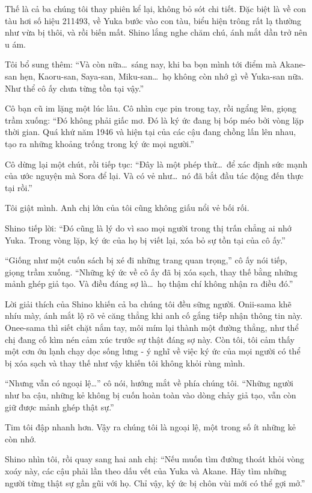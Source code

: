 \documentclass[../main.tex]{subfiles}
\begin{document}
Thế là cả ba chúng tôi thay phiên kể lại, không bỏ sót chi tiết. Đặc biệt là về con tàu hơi số hiệu 211493, về Yuka bước vào con tàu, biểu hiện trông rất lạ thường như vừa bị thôi, và rồi biến mất. Shino lắng nghe chăm chú, ánh mắt dần trở nên u ám.

Tôi bổ sung thêm: ``Và còn nữa\dots\ sáng nay, khi ba bọn mình tới điểm mà Akane-san hẹn, Kaoru-san, Saya-san, Miku-san\dots\ họ không còn nhớ gì về Yuka-san nữa. Như thể cô ấy chưa từng tồn tại vậy.''

Cô bạn cũ im lặng một lúc lâu. Cô nhìn cục pin trong tay, rồi ngẩng lên, giọng trầm xuống: ``Đó không phải giấc mơ. Đó là ký ức đang bị bóp méo bởi vòng lặp thời gian. Quá khứ năm 1946 và hiện tại của các cậu đang chồng lấn lên nhau, tạo ra những khoảng trống trong ký ức mọi người.''

Cô dừng lại một chút, rồi tiếp tục: ``Đây là một phép thử\dots\ để xác định sức mạnh của ước nguyện mà Sora để lại. Và có vẻ như\dots\ nó đã bắt đầu tác động đến thực tại rồi.''

Tôi giật mình. Anh chị lớn của tôi cũng không giấu nổi vẻ bối rối.

Shino tiếp lời: ``Đó cũng là lý do vì sao mọi người trong thị trấn chẳng ai nhớ Yuka. Trong vòng lặp, ký ức của họ bị viết lại, xóa bỏ sự tồn tại của cô ấy.''

``Giống như một cuốn sách bị xé đi những trang quan trọng,'' cô ấy nói tiếp, giọng trầm xuống. ``Những ký ức về cô ấy đã bị xóa sạch, thay thế bằng những mảnh ghép giả tạo. Và điều đáng sợ là\dots\ họ thậm chí không nhận ra điều đó.''

Lời giải thích của Shino khiến cả ba chúng tôi đều sững người. Onii-sama khẽ nhíu mày, ánh mắt lộ rõ vẻ căng thẳng khi anh cố gắng tiếp nhận thông tin này. Onee-sama thì siết chặt nắm tay, môi mím lại thành một đường thẳng, như thể chị đang cố kìm nén cảm xúc trước sự thật đáng sợ này. Còn tôi, tôi cảm thấy một cơn ớn lạnh chạy dọc sống lưng - ý nghĩ về việc ký ức của mọi người có thể bị xóa sạch và thay thế như vậy khiến tôi không khỏi rùng mình.

``Nhưng vẫn có ngoại lệ\dots'' cô nói, hướng mắt về phía chúng tôi. ``Những người như ba cậu, những kẻ không bị cuốn hoàn toàn vào dòng chảy giả tạo, vẫn còn giữ được mảnh ghép thật sự.''

Tim tôi đập nhanh hơn. Vậy ra chúng tôi là ngoại lệ, một trong số ít những kẻ còn nhớ.

Shino nhìn tôi, rồi quay sang hai anh chị: ``Nếu muốn tìm đường thoát khỏi vòng xoáy này, các cậu phải lần theo dấu vết của Yuka và Akane. Hãy tìm những người từng thật sự gần gũi với họ. Chỉ vậy, ký ức bị chôn vùi mới có thể gợi mở.''
\end{document}
